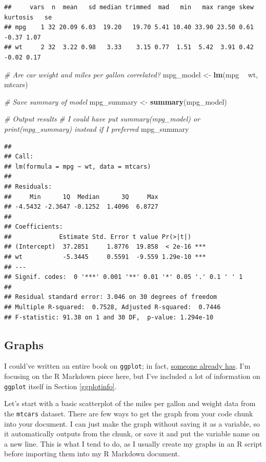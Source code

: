 \documentclass[
]{book}
\newenvironment{Shaded}{\begin{snugshade}}{\end{snugshade}}
\newcommand{\CommentTok}[1]{\textcolor[rgb]{0.56,0.35,0.01}{\textit{#1}}}
\newcommand{\KeywordTok}[1]{\textcolor[rgb]{0.13,0.29,0.53}{\textbf{#1}}}
\newcommand{\NormalTok}[1]{#1}
\newcommand{\OperatorTok}[1]{\textcolor[rgb]{0.81,0.36,0.00}{\textbf{#1}}}
\newcommand{\StringTok}[1]{\textcolor[rgb]{0.31,0.60,0.02}{#1}}
\begin{document}
\begin{verbatim}
##     vars  n  mean   sd median trimmed  mad   min   max range skew kurtosis   se
## mpg    1 32 20.09 6.03  19.20   19.70 5.41 10.40 33.90 23.50 0.61    -0.37 1.07
## wt     2 32  3.22 0.98   3.33    3.15 0.77  1.51  5.42  3.91 0.42    -0.02 0.17
\end{verbatim}

\begin{Shaded}
\begin{Highlighting}[]
\CommentTok{# Are car weight and miles per gallon correlated?}
\NormalTok{mpg_model <-}\StringTok{ }\KeywordTok{lm}\NormalTok{(mpg }\OperatorTok{~}\StringTok{ }\NormalTok{wt, mtcars)}

\CommentTok{# Save summary of model}
\NormalTok{mpg_summary <-}\StringTok{ }\KeywordTok{summary}\NormalTok{(mpg_model)}

\CommentTok{# Output results}
  \CommentTok{# I could have put summary(mpg_model) or print(mpg_summary) instead if I preferred}
\NormalTok{mpg_summary}
\end{Highlighting}
\end{Shaded}

\begin{verbatim}
## 
## Call:
## lm(formula = mpg ~ wt, data = mtcars)
## 
## Residuals:
##     Min      1Q  Median      3Q     Max 
## -4.5432 -2.3647 -0.1252  1.4096  6.8727 
## 
## Coefficients:
##             Estimate Std. Error t value Pr(>|t|)    
## (Intercept)  37.2851     1.8776  19.858  < 2e-16 ***
## wt           -5.3445     0.5591  -9.559 1.29e-10 ***
## ---
## Signif. codes:  0 '***' 0.001 '**' 0.01 '*' 0.05 '.' 0.1 ' ' 1
## 
## Residual standard error: 3.046 on 30 degrees of freedom
## Multiple R-squared:  0.7528, Adjusted R-squared:  0.7446 
## F-statistic: 91.38 on 1 and 30 DF,  p-value: 1.294e-10
\end{verbatim}

\hypertarget{graph}{%
\subsection{Graphs}\label{graph}}

I could've written an entire book on \texttt{ggplot}; in fact, \href{https://ggplot2-book.org/}{someone already has}. I'm focusing on the R Markdown piece here, but I've included a lot of information on \texttt{ggplot} itself in Section \ref{ggplotinfo}.

Let's start with a basic scatterplot of the miles per gallon and weight data from the \texttt{mtcars} dataset. There are few ways to get the graph from your code chunk into your document. I can just make the graph without saving it as a variable, so it automatically outputs from the chunk, or save it and put the variable name on a new line. This is what I tend to do, as I usually create my graphs in an R script before importing them into my R Markdown document.
\end{document}

